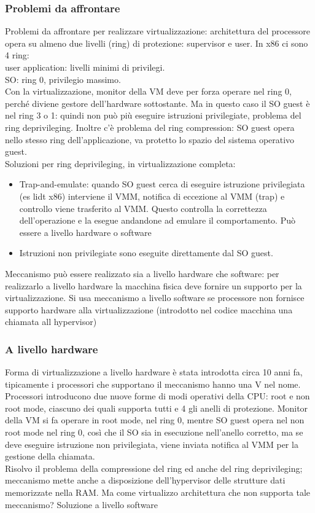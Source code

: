 \documentclass{article}
\begin{document}
\subsubsection{Problemi da affrontare}
Problemi da affrontare per realizzare virtualizzazione: architettura del processore opera su almeno due livelli (ring) di protezione: supervisor e user. In x86 ci sono 4 ring:\\ user application: livelli minimi di privilegi.\\
SO: ring 0, privilegio massimo.\\
Con la virtualizzazione, monitor della VM deve per forza operare nel ring 0, perché diviene gestore dell'hardware sottostante. Ma in questo caso il SO guest è nel ring 3 o 1: quindi non può più eseguire istruzioni privilegiate, problema del ring deprivileging. Inoltre c'è problema del ring compression: SO guest opera nello stesso ring dell'applicazione, va protetto lo spazio del sistema operativo guest.\\ Soluzioni per ring deprivileging, in virtualizzazione completa:
\begin{itemize}
\item Trap-and-emulate: quando SO guest cerca di eseguire istruzione privilegiata (es lidt x86) interviene il VMM, notifica di eccezione al VMM (trap) e controllo viene trasferito al VMM. Questo controlla la correttezza dell'operazione e la esegue andandone ad emulare il comportamento. Può essere a livello hardware o software
\item Istruzioni non privilegiate sono eseguite direttamente dal SO guest.
\end{itemize}
Meccanismo può essere realizzato sia a livello hardware che software: per realizzarlo a livello hardware la macchina fisica deve fornire un supporto per la virtualizzazione. Si usa meccanismo a livello software se processore non fornisce supporto hardware alla virtualizzazione (introdotto nel codice macchina una chiamata all hypervisor)
\subsubsection{A livello hardware}
Forma di virtualizzazione a livello hardware è stata introdotta circa 10 anni fa, tipicamente i processori che supportano il meccanismo hanno una V nel nome.\\ Processori introducono due nuove forme di modi operativi della CPU: root e non root mode, ciascuno dei quali supporta tutti e 4 gli anelli di protezione. Monitor della VM si fa operare in root mode, nel ring 0, mentre SO guest opera nel non root mode nel ring 0, così che il SO sia in esecuzione nell'anello corretto, ma se deve eseguire istruzione non privilegiata, viene inviata notifica al VMM per la gestione della chiamata.\\ Risolvo il problema della compressione del ring ed anche del ring deprivileging; meccanismo mette anche a disposizione dell'hypervisor delle strutture dati memorizzate nella RAM. Ma come virtualizzo architettura che non supporta tale meccanismo? Soluzione a livello software
\end{document}
